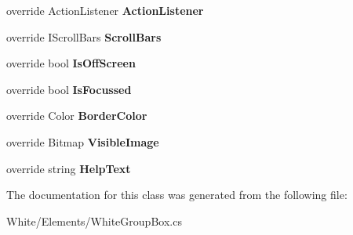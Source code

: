\begin{DoxyCompactItemize}
\item 
\hypertarget{class_proto_test_1_1_golem_1_1_white_1_1_elements_1_1_white_group_box_a94ef9cc84d6362d3a2d3f5b8e310699d}{override Action\-Listener {\bfseries Action\-Listener}}\label{class_proto_test_1_1_golem_1_1_white_1_1_elements_1_1_white_group_box_a94ef9cc84d6362d3a2d3f5b8e310699d}

\item 
\hypertarget{class_proto_test_1_1_golem_1_1_white_1_1_elements_1_1_white_group_box_a84e490b7b4615ba5e4680fd8b9578072}{override I\-Scroll\-Bars {\bfseries Scroll\-Bars}}\label{class_proto_test_1_1_golem_1_1_white_1_1_elements_1_1_white_group_box_a84e490b7b4615ba5e4680fd8b9578072}

\item 
\hypertarget{class_proto_test_1_1_golem_1_1_white_1_1_elements_1_1_white_group_box_a749c178fbbe36b17bb2b82f21d0e01f3}{override bool {\bfseries Is\-Off\-Screen}}\label{class_proto_test_1_1_golem_1_1_white_1_1_elements_1_1_white_group_box_a749c178fbbe36b17bb2b82f21d0e01f3}

\item 
\hypertarget{class_proto_test_1_1_golem_1_1_white_1_1_elements_1_1_white_group_box_a3b30afbe2b98c1ae8b7b41addc3511f2}{override bool {\bfseries Is\-Focussed}}\label{class_proto_test_1_1_golem_1_1_white_1_1_elements_1_1_white_group_box_a3b30afbe2b98c1ae8b7b41addc3511f2}

\item 
\hypertarget{class_proto_test_1_1_golem_1_1_white_1_1_elements_1_1_white_group_box_a86ad35ae23038136e80eb50aaeb1a3c5}{override Color {\bfseries Border\-Color}}\label{class_proto_test_1_1_golem_1_1_white_1_1_elements_1_1_white_group_box_a86ad35ae23038136e80eb50aaeb1a3c5}

\item 
\hypertarget{class_proto_test_1_1_golem_1_1_white_1_1_elements_1_1_white_group_box_a82c2bfdad1b8160ceed365ef6fc6e0dc}{override Bitmap {\bfseries Visible\-Image}}\label{class_proto_test_1_1_golem_1_1_white_1_1_elements_1_1_white_group_box_a82c2bfdad1b8160ceed365ef6fc6e0dc}

\item 
\hypertarget{class_proto_test_1_1_golem_1_1_white_1_1_elements_1_1_white_group_box_a0a7066087d445aeaff74584e43d6acec}{override string {\bfseries Help\-Text}}\label{class_proto_test_1_1_golem_1_1_white_1_1_elements_1_1_white_group_box_a0a7066087d445aeaff74584e43d6acec}

\end{DoxyCompactItemize}


The documentation for this class was generated from the following file\-:\begin{DoxyCompactItemize}
\item 
White/\-Elements/White\-Group\-Box.\-cs\end{DoxyCompactItemize}
